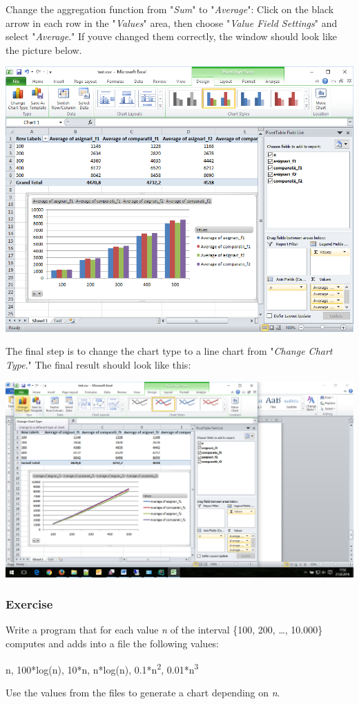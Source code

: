 \documentclass[../en-fa-lab.tex]{subfiles}
\begin{document}
Change the aggregation function from "\emph{Sum}" to "\emph{Average}":
Click on the black arrow in each row in the "\emph{Values}" area, then
choose "\emph{Value Field Settings}" and select "\emph{Average}." If
you\textquotesingle ve changed them correctly, the window should look
like the picture below.

\includegraphics[width=\textwidth]{../Resources/lab0/image14.png}

The final step is to change the chart type to a line chart from
"\emph{Change Chart Type}." The final result should look like this:

\includegraphics[width=\textwidth]{../Resources/lab0/image15.png}

\subsubsection{Exercise}\label{exerciux21biu}

Write a program that for each value \emph{n} of the interval \{100, 200,
\ldots, 10.000\} computes and adds into a file the following values:

n, 100*log(n), 10*n, n*log(n), 0.1*n\textsuperscript{2},
0.01*n\textsuperscript{3}

Use the values from the files to generate a chart depending on \emph{n}.
\end{document}

